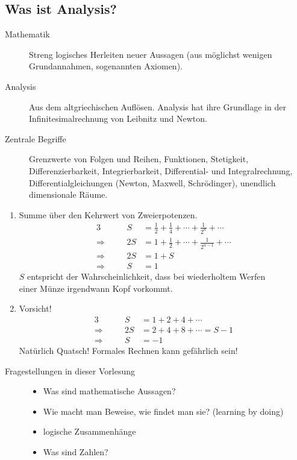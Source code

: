 \documentclass[../ana1.tex]{subfiles}
\begin{document}
\setcounter{section}{0}

\begin{prosa}
\section{Was ist Analysis?}
\begin{description}
	\item[Mathematik]
		Streng logisches Herleiten neuer Aussagen (aus möglichst wenigen Grundannahmen, sogenannten Axiomen).
	\item[Analysis]
		Aus dem altgriechischen \glqq Auflösen\grqq. Analysis hat ihre Grundlage in der \glqq Infinitesimalrechnung\grqq\: von Leibnitz und Newton.
	\item[Zentrale Begriffe]
		Grenzwerte von Folgen und Reihen, Funktionen, Stetigkeit, Differenzierbarkeit, Integrierbarkeit, Differential- und Integralrechnung, Differentialgleichungen (Newton, Maxwell, Schrödinger), unendlich dimensionale Räume.
\end{description}
\begin{bspe}\leavevmode
	\begin{enumerate}[(1)]
		\item Summe über den Kehrwert von Zweierpotenzen.
			\begin{alignat*}{3}
							   &&             S &= \frac{1}{2} + \frac{1}{4} + \cdots + \frac{1}{2^{n}} + \cdots \\
				\Longrightarrow&\quad& 		 2S &= 1 + \frac{1}{2} + \cdots + \frac{1}{2^{n-1}} + \cdots \\
				\Longrightarrow&\quad& 	     2S &= 1 + S \\
				\Longrightarrow&&             S &= 1
			\end{alignat*}
			\(S\) entspricht der Wahrscheinlichkeit, dass bei wiederholtem Werfen \\
			einer Münze irgendwann Kopf vorkommt.\\
		\item Vorsicht!
			\begin{alignat*}{3}
							   &&       S &= 1 + 2 + 4 + \cdots\\
				\Longrightarrow&\quad& 2S &= 2 + 4 + 8 + \cdots = S - 1\\
				\Longrightarrow&\quad&  S &= -1
			\end{alignat*}
			Natürlich Quatsch! Formales Rechnen kann gefährlich sein!
	\end{enumerate}
\end{bspe}
\begin{description}
	\item[Fragestellungen in dieser Vorlesung]\leavevmode
		\begin{itemize}[-]
			\item Was sind mathematische Aussagen?
			\item Wie macht man Beweise, wie findet man sie? (learning by doing)
			\item logische Zusammenhänge
			\item Was sind Zahlen?
		\end{itemize} 
\end{description}
\end{prosa}
\end{document}
